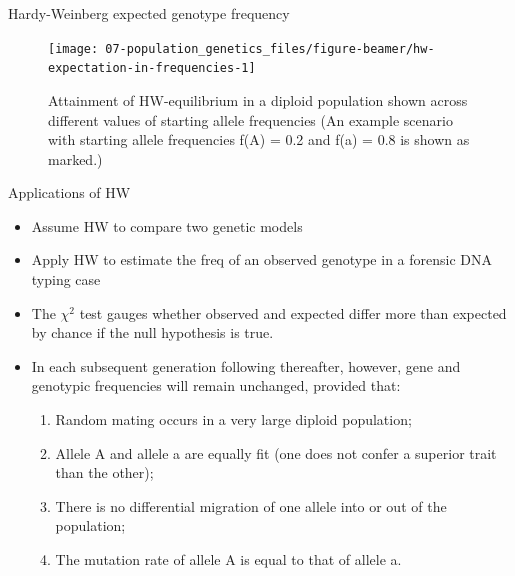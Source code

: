 \documentclass[11pt,dvipsnames,ignorenonframetext,aspectratio=169]{beamer}
\providecommand{\tightlist}{%
  \setlength{\itemsep}{0pt}\setlength{\parskip}{0pt}}
\begin{document}
\begin{frame}{Hardy-Weinberg expected genotype frequency}
\protect\hypertarget{hardy-weinberg-expected-genotype-frequency}{}
\begin{figure}[center]
\texttt{[image: 07-population\_genetics\_files/figure-beamer/hw-expectation-in-frequencies-1]} \caption{Attainment of HW-equilibrium in a diploid population shown across different values of starting allele frequencies (An example scenario with starting allele frequencies f(A) = 0.2 and f(a) = 0.8 is shown as marked.)}\label{fig:hw-expectation-in-frequencies}
\end{figure}
\end{frame}

\begin{frame}{Applications of HW}
\protect\hypertarget{applications-of-hw}{}
\begin{itemize}
\tightlist
\item
  Assume HW to compare two genetic models
\item
  Apply HW to estimate the freq of an observed genotype in a forensic
  DNA typing case
\item
  The \(\chi^2\) test gauges whether observed and expected differ more
  than expected by chance if the null hypothesis is true.
\end{itemize}
\end{frame}

\begin{frame}{}
\protect\hypertarget{section-15}{}
\begin{itemize}
\tightlist
\item
  In each subsequent generation following thereafter, however, gene and
  genotypic frequencies will remain unchanged, provided that:

  \begin{enumerate}
  \tightlist
  \item
    Random mating occurs in a very large diploid population;
  \item
    Allele A and allele a are equally fit (one does not confer a
    superior trait than the other);
  \item
    There is no differential migration of one allele into or out of the
    population;
  \item
    The mutation rate of allele A is equal to that of allele a.
  \end{enumerate}
\end{itemize}
\end{frame}
\end{document}
